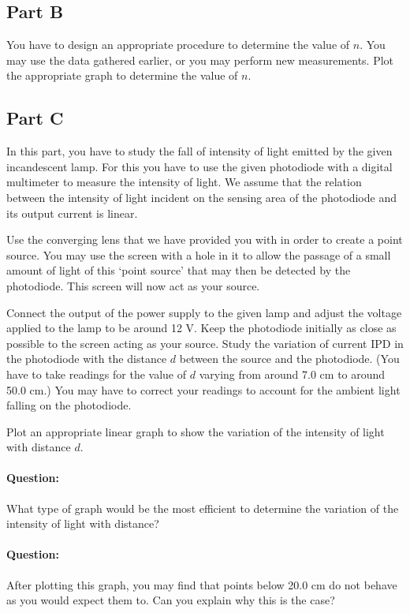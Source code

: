 \subsection*{Part B}

You have to design an appropriate procedure to determine the value of $n$. You may use the data gathered earlier, or you may perform new measurements. Plot the appropriate graph to determine the value of $n$.

\subsection*{Part C}

In this part, you have to study the fall of intensity of light emitted by the given incandescent lamp.  For this you have to use the given photodiode with a digital multimeter to measure the intensity of light. We assume that the relation between the intensity of light incident on the sensing area of the photodiode and its output current is linear. 

Use the converging lens that we have provided you with in order to create a point source. You may use the screen with a hole in it to allow the passage of a small amount of light of this `point source' that may then be detected by the photodiode. This screen will now act as your source.

Connect the output of the power supply to the given lamp and adjust the voltage applied to the lamp to be around 12 V. Keep the photodiode initially as close as possible to the screen acting as your source.  Study the variation of current IPD in the photodiode with the distance $d$ between the source and the photodiode. (You have to take readings for the value of $d$ varying from around 7.0 cm to around 50.0 cm.) You may have to correct your readings to account for the ambient light falling on the photodiode. 

Plot an appropriate linear graph to show the variation of the intensity of light with distance $d$.

\paragraph{Question:} What type of graph would be the most efficient to determine the variation of the intensity of light with distance?

\paragraph{Question:} After plotting this graph, you may find that points below 20.0 cm do not behave as you would expect them to. Can you explain why this is the case?


